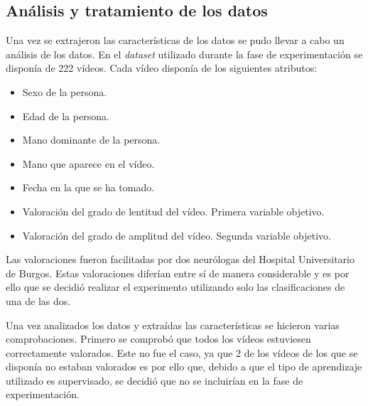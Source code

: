 \subsection{Análisis y tratamiento de los datos}
Una vez se extrajeron las características de los datos se pudo llevar a cabo un análisis de los datos.
En el \textit{dataset} utilizado durante la fase de experimentación se disponía de 222 vídeos. 
Cada vídeo disponía de los siguientes atributos:
\begin{itemize}
\item Sexo de la persona.
\item Edad de la persona.
\item Mano dominante de la persona.
\item Mano que aparece en el vídeo.
\item Fecha en la que se ha tomado.
\item Valoración del grado de lentitud del vídeo. Primera variable objetivo.
\item Valoración del grado de amplitud del vídeo. Segunda variable objetivo.
\end{itemize}
Las valoraciones fueron facilitadas por dos neurólogas del  Hospital Universitario de Burgos. Estas valoraciones diferían entre sí de manera considerable y es por ello que se decidió realizar el experimento utilizando solo las clasificaciones de una de las dos. 

Una vez analizados los datos y extraídas las características se hicieron varias comprobaciones. Primero se comprobó que todos los vídeos estuviesen correctamente valorados. Este no fue el caso, ya que 2 de los vídeos de los que se disponía no estaban valorados es por ello que, debido a que el tipo de aprendizaje utilizado es supervisado, se decidió que no se incluirían en la fase de experimentación.

